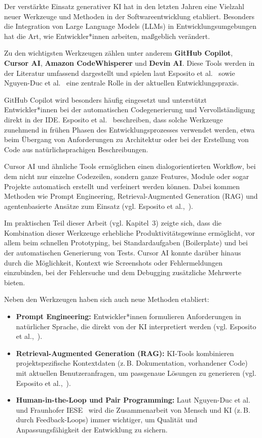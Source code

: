 Der verstärkte Einsatz generativer KI hat in den letzten Jahren eine Vielzahl
neuer Werkzeuge und Methoden in der Softwareentwicklung etabliert. Besonders
die Integration von Large Language Models (LLMs) in Entwicklungsumgebungen hat
die Art, wie Entwickler*innen arbeiten, maßgeblich verändert.

Zu den wichtigsten Werkzeugen zählen unter anderem \textbf{GitHub Copilot},
\textbf{Cursor AI}, \textbf{Amazon CodeWhisperer} und \textbf{Devin AI}. Diese
Tools werden in der Literatur umfassend dargestellt und spielen laut Esposito
et al.~\cite{esposito_generative_2025} sowie Nguyen-Duc et
al.~\cite{duc_generative_2023} eine zentrale Rolle in der aktuellen
Entwicklungspraxis.

GitHub Copilot wird besonders häufig eingesetzt und unterstützt
Entwickler*innen bei der automatischen Codegenerierung und Vervollständigung
direkt in der IDE. Esposito et al.~\cite[S.~2]{esposito_generative_2025}
beschreiben, dass solche Werkzeuge zunehmend in frühen Phasen des
Entwicklungsprozesses verwendet werden, etwa beim Übergang von Anforderungen zu
Architektur oder bei der Erstellung von Code aus natürlichsprachigen
Beschreibungen.

Cursor AI und ähnliche Tools ermöglichen einen dialogorientierten Workflow, bei
dem nicht nur einzelne Codezeilen, sondern ganze Features, Module oder sogar
Projekte automatisch erstellt und verfeinert werden können. Dabei kommen
Methoden wie Prompt Engineering, Retrieval-Augmented Generation (RAG) und
agentenbasierte Ansätze zum Einsatz (vgl. Esposito et
al.,~\cite[S.~3--4]{esposito_generative_2025}).

Im praktischen Teil dieser Arbeit (vgl. Kapitel~3) zeigte sich, dass die
Kombination dieser Werkzeuge erhebliche Produktivitätsgewinne ermöglicht, vor
allem beim schnellen Prototyping, bei Standardaufgaben (Boilerplate) und bei
der automatischen Generierung von Tests. Cursor AI konnte darüber hinaus durch
die Möglichkeit, Kontext wie Screenshots oder Fehlermeldungen einzubinden, bei
der Fehlersuche und dem Debugging zusätzliche Mehrwerte bieten.

Neben den Werkzeugen haben sich auch neue Methoden etabliert:
\begin{itemize}
    \item \textbf{Prompt Engineering:} Entwickler*innen formulieren Anforderungen in natürlicher Sprache, die direkt von der KI interpretiert werden (vgl. Esposito et al.,~\cite[S.~2--3]{esposito_generative_2025}).
    \item \textbf{Retrieval-Augmented Generation (RAG):} KI-Tools kombinieren projektspezifische Kontextdaten (z.\,B. Dokumentation, vorhandener Code) mit aktuellen Benutzeranfragen, um passgenaue Lösungen zu generieren (vgl. Esposito et al.,~\cite[S.~4]{esposito_generative_2025}).
    \item \textbf{Human-in-the-Loop und Pair Programming:} Laut Nguyen-Duc et al.~\cite[S.~8]{nguyen-duc_generative_2023} und Fraunhofer IESE~\cite{siebert_generative_2024} wird die Zusammenarbeit von Mensch und KI (z.\,B. durch Feedback-Loops) immer wichtiger, um Qualität und Anpassungsfähigkeit der Entwicklung zu sichern.
\end{itemize}

